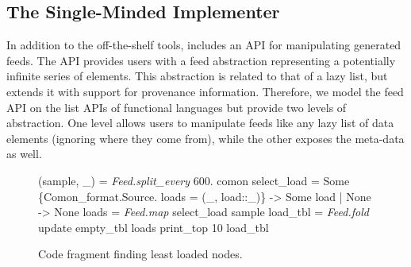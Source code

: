 

\subsection{The Single-Minded Implementer}

In addition to the off-the-shelf tools, \padsd{} includes an API for
manipulating generated feeds. The API provides 
users with a feed abstraction representing a potentially infinite
series of elements. This abstraction is related to that of a lazy
list, but extends it with support for provenance information. 
Therefore, we model the feed API on the
list APIs of functional languages
but provide two levels of abstraction. One level allows users to
manipulate feeds like any lazy list of data elements (ignoring
where they come from), while the other exposes the meta-data as well. 



\begin{figure}[tb]
\begin{codebox}
 (sample, \_) = \textit{Feed.split_every} 600. comon 
 select_load = 
    Some \{Comon_format.Source.
          loads = (_, load::_)\} -> Some load
  | None -> None 
 loads    = \textit{Feed.map} select_load sample 
 load_tbl = \textit{Feed.fold} update empty_tbl loads 
  print_top 10 load_tbl
\end{codebox}
  \caption{Code fragment finding least loaded \planetlab nodes.}
\label{fig:sample-loads}
\end{figure}



